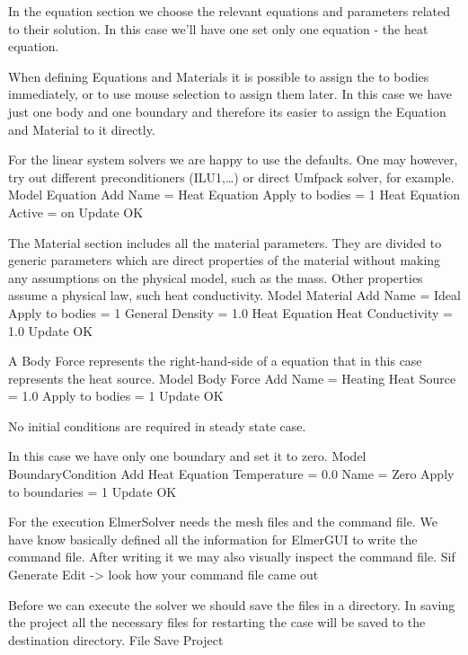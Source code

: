 In the equation section we choose the relevant equations and parameters related to their solution. 
In this case we'll have one set only one equation - the heat equation.


When defining Equations and Materials it is possible to assign the to bodies immediately, or to use mouse
selection to assign them later. In this case we have just one body and one boundary and therefore its easier to assign 
the Equation and Material to it directly.

For the linear system solvers we are happy to use the defaults. One may however, try out different
preconditioners (ILU1,\ldots) or direct Umfpack solver, for example.
\ttbegin
Model
  Equation
    Add 
      Name = Heat Equation
      Apply to bodies = 1
      Heat Equation
        Active = on
  Update   
  OK
\ttend        

The Material section includes all the material parameters.
They are divided to generic parameters which are direct properties of the material
without making any assumptions on the physical model, such as the mass. Other properties assume
a physical law, such heat conductivity.
\ttbegin
Model
  Material
    Add 
      Name = Ideal
      Apply to bodies = 1 
      General    
        Density = 1.0
      Heat Equation
        Heat Conductivity = 1.0
    Update
    OK
\ttend

A Body Force represents the right-hand-side of a equation that in this case represents
the heat source. 
\ttbegin
Model
  Body Force
    Add 
      Name = Heating
      Heat Source = 1.0
      Apply to bodies = 1
    Update
    OK
\ttend    

No initial conditions are required in steady state case.

In this case we have only one boundary and set it to zero.
\ttbegin
Model
  BoundaryCondition
    Add 
      Heat Equation
        Temperature = 0.0
      Name = Zero
      Apply to boundaries = 1
    Update
    OK
\ttend   


For the execution 
ElmerSolver needs the mesh files and the command file. We have know basically defined
all the information for ElmerGUI to write the command file. After writing it we may also visually 
inspect the command file.
\ttbegin
Sif 
  Generate
  Edit -> look how your command file came out  
\ttend

Before we can execute the solver we should save the files in a directory. In saving the project all the
necessary files for restarting the case will be saved to the 
destination directory.
\ttbegin
File 
  Save Project
\ttend

